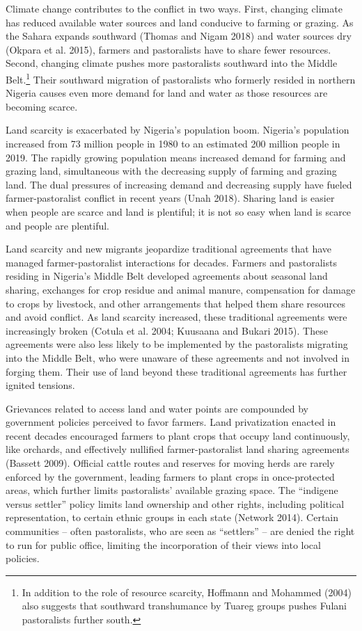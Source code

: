 \documentclass[11pt]{article}
\begin{document}
Climate change contributes to the conflict in two ways. First, changing
climate has reduced available water sources and land conducive to
farming or grazing. As the Sahara expands southward (Thomas and Nigam
2018) and water sources dry (Okpara et al. 2015), farmers and
pastoralists have to share fewer resources. Second, changing climate
pushes more pastoralists southward into the Middle Belt.\footnote{In
  addition to the role of resource scarcity, Hoffmann and Mohammed
  (2004) also suggests that southward transhumance by Tuareg groups
  pushes Fulani pastoralists further south.} Their southward migration
of pastoralists who formerly resided in northern Nigeria causes even
more demand for land and water as those resources are becoming scarce.

Land scarcity is exacerbated by Nigeria's population boom. Nigeria's
population increased from 73 million people in 1980 to an estimated 200
million people in 2019. The rapidly growing population means increased
demand for farming and grazing land, simultaneous with the decreasing
supply of farming and grazing land. The dual pressures of increasing
demand and decreasing supply have fueled farmer-pastoralist conflict in
recent years (Unah 2018). Sharing land is easier when people are scarce
and land is plentiful; it is not so easy when land is scarce and people
are plentiful.

Land scarcity and new migrants jeopardize traditional agreements that
have managed farmer-pastoralist interactions for decades. Farmers and
pastoralists residing in Nigeria's Middle Belt developed agreements
about seasonal land sharing, exchanges for crop residue and animal
manure, compensation for damage to crops by livestock, and other
arrangements that helped them share resources and avoid conflict. As
land scarcity increased, these traditional agreements were increasingly
broken (Cotula et al. 2004; Kuusaana and Bukari 2015). These agreements
were also less likely to be implemented by the pastoralists migrating
into the Middle Belt, who were unaware of these agreements and not
involved in forging them. Their use of land beyond these traditional
agreements has further ignited tensions.

Grievances related to access land and water points are compounded by
government policies perceived to favor farmers. Land privatization
enacted in recent decades encouraged farmers to plant crops that occupy
land continuously, like orchards, and effectively nullified
farmer-pastoralist land sharing agreements (Bassett 2009). Official
cattle routes and reserves for moving herds are rarely enforced by the
government, leading farmers to plant crops in once-protected areas,
which further limits pastoralists' available grazing space. The
``indigene versus settler'' policy limits land ownership and other
rights, including political representation, to certain ethnic groups in
each state (Network 2014). Certain communities -- often pastoralists,
who are seen as ``settlers'' -- are denied the right to run for public
office, limiting the incorporation of their views into local policies.
\end{document}
